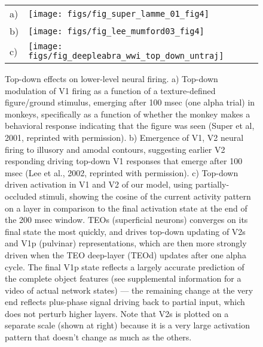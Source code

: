 \documentclass[11pt,twoside]{article}
\newif\myifpdf
\begin{document}
\begin{figure}
  \begin{center}
    \begin{tabular}{ll}
      \parbox[b]{.1em}{a) \vspace*{1.4in}} &
      \texttt{[image: figs/fig\_super\_lamme\_01\_fig4]} \\
      \parbox[b]{.1em}{b) \vspace*{1.4in}} &
      \texttt{[image: figs/fig\_lee\_mumford03\_fig4]} \\
      \parbox[b]{.1em}{c) \vspace*{1.4in}} &
      \texttt{[image: figs/fig\_deepleabra\_wwi\_top\_down\_untraj]}
    \end{tabular}
  \end{center}
  \caption{\footnotesize Top-down effects on lower-level neural firing.  a) Top-down modulation of V1 firing as a function of a texture-defined figure/ground stimulus, emerging after 100 msec (one alpha trial) in monkeys, specifically as a function of whether the monkey makes a behavioral response indicating that the figure was seen (Super et al, 2001, reprinted with permission).  b) Emergence of V1, V2 neural firing to illusory and amodal contours, suggesting earlier V2 responding driving top-down V1 responses that emerge after 100 msec (Lee et al., 2002, reprinted with permission).  c) Top-down driven activation in V1 and V2 of our model, using partially-occluded stimuli, showing the cosine of the current activity pattern on a layer in comparison to the final activation state at the end of the 200 msec window.  TEOs (superficial neurons) converges on its final state the most quickly, and drives top-down updating of V2s and V1p (pulvinar) representations, which are then more strongly driven when the TEO deep-layer (TEOd) updates after one alpha cycle.  The final V1p state reflects a largely accurate prediction of the complete object features (see supplemental information for a video of actual network states) --- the remaining change at the very end reflects plus-phase signal driving back to partial input, which does not perturb higher layers.  Note that V2s is plotted on a separate scale (shown at right) because it is a very large activation pattern that doesn't change as much as the others.}
  \label{fig.top_down}
\end{figure}
\end{document}
